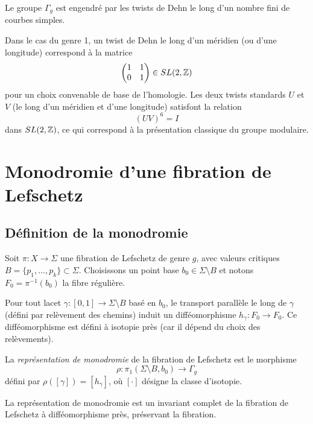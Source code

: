 \begin{theoreme}[Dehn]
Le groupe $\Gamma_g$ est engendré par les twists de Dehn le long d'un nombre fini de courbes simples.
\end{theoreme}

Dans le cas du genre 1, un twist de Dehn le long d'un méridien (ou d'une longitude) correspond à la matrice
\[
\begin{pmatrix} 1 & 1 \\ 0 & 1 \end{pmatrix} \in SL(2,\mathbb{Z})
\]
pour un choix convenable de base de l'homologie. Les deux twists standards $U$ et $V$ (le long d'un méridien et d'une longitude) satisfont la relation
\[
(UV)^6 = I
\]
dans $SL(2,\mathbb{Z})$, ce qui correspond à la présentation classique du groupe modulaire.

\section{Monodromie d'une fibration de Lefschetz}

\subsection{Définition de la monodromie}

Soit $\pi: X \to \Sigma$ une fibration de Lefschetz de genre $g$, avec valeurs critiques $B = \{p_1, \dots, p_k\} \subset \Sigma$. Choisissons un point base $b_0 \in \Sigma \setminus B$ et notons $F_0 = \pi^{-1}(b_0)$ la fibre régulière.

Pour tout lacet $\gamma: [0,1] \to \Sigma \setminus B$ basé en $b_0$, le transport parallèle le long de $\gamma$ (défini par relèvement des chemins) induit un difféomorphisme $h_\gamma: F_0 \to F_0$. Ce difféomorphisme est défini à isotopie près (car il dépend du choix des relèvements).

\begin{definition}
La \emph{représentation de monodromie} de la fibration de Lefschetz est le morphisme
\[
\rho: \pi_1(\Sigma \setminus B, b_0) \longrightarrow \Gamma_g
\]
défini par $\rho([\gamma]) = [h_\gamma]$, où $[\cdot]$ désigne la classe d'isotopie.
\end{definition}

\begin{theoreme}
La représentation de monodromie est un invariant complet de la fibration de Lefschetz à difféomorphisme près, préservant la fibration.
\end{theoreme}

